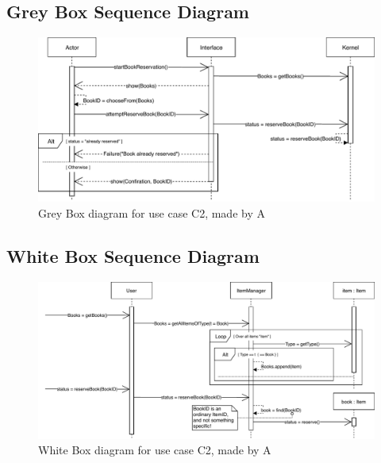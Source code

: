 \subsection*{Grey Box Sequence Diagram}
\begin{figure}[H]
	\centering
	\includegraphics[scale=.9]{uml/SD-gb-reserve.pdf}
	\caption*{Grey Box diagram for use case C2, made by A}
\end{figure}
\subsection*{White Box Sequence Diagram}
\begin{figure}[H]
	\centering
	\includegraphics[scale=.85]{uml/SD-wb-reserve.pdf}
	\caption*{White Box diagram for use case C2, made by A}
\end{figure}